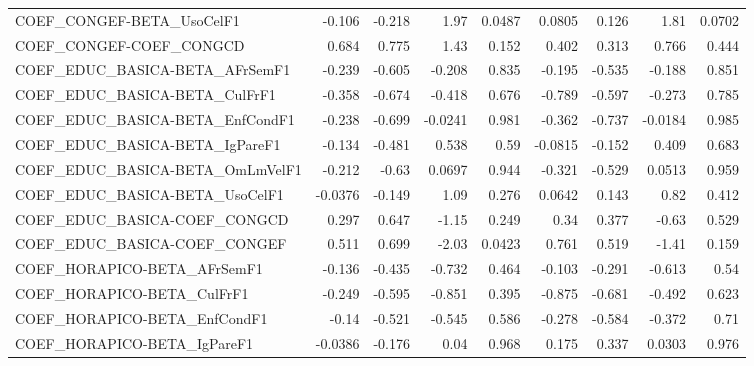 \begin{tabular}{lrrrrrrrr}
COEF\_CONGEF-BETA\_UsoCelF1             &      -0.106 &       -0.218 &    1.97 &   0.0487 &     0.0805 &       0.126 &         1.81 &        0.0702 \\
COEF\_CONGEF-COEF\_CONGCD               &       0.684 &        0.775 &    1.43 &    0.152 &      0.402 &       0.313 &        0.766 &         0.444 \\
COEF\_EDUC\_BASICA-BETA\_AFrSemF1        &      -0.239 &       -0.605 &  -0.208 &    0.835 &     -0.195 &      -0.535 &       -0.188 &         0.851 \\
COEF\_EDUC\_BASICA-BETA\_CulFrF1         &      -0.358 &       -0.674 &  -0.418 &    0.676 &     -0.789 &      -0.597 &       -0.273 &         0.785 \\
COEF\_EDUC\_BASICA-BETA\_EnfCondF1       &      -0.238 &       -0.699 & -0.0241 &    0.981 &     -0.362 &      -0.737 &      -0.0184 &         0.985 \\
COEF\_EDUC\_BASICA-BETA\_IgPareF1        &      -0.134 &       -0.481 &   0.538 &     0.59 &    -0.0815 &      -0.152 &        0.409 &         0.683 \\
COEF\_EDUC\_BASICA-BETA\_OmLmVelF1       &      -0.212 &        -0.63 &  0.0697 &    0.944 &     -0.321 &      -0.529 &       0.0513 &         0.959 \\
COEF\_EDUC\_BASICA-BETA\_UsoCelF1        &     -0.0376 &       -0.149 &    1.09 &    0.276 &     0.0642 &       0.143 &         0.82 &         0.412 \\
COEF\_EDUC\_BASICA-COEF\_CONGCD          &       0.297 &        0.647 &   -1.15 &    0.249 &       0.34 &       0.377 &        -0.63 &         0.529 \\
COEF\_EDUC\_BASICA-COEF\_CONGEF          &       0.511 &        0.699 &   -2.03 &   0.0423 &      0.761 &       0.519 &        -1.41 &         0.159 \\
COEF\_HORAPICO-BETA\_AFrSemF1           &      -0.136 &       -0.435 &  -0.732 &    0.464 &     -0.103 &      -0.291 &       -0.613 &          0.54 \\
COEF\_HORAPICO-BETA\_CulFrF1            &      -0.249 &       -0.595 &  -0.851 &    0.395 &     -0.875 &      -0.681 &       -0.492 &         0.623 \\
COEF\_HORAPICO-BETA\_EnfCondF1          &       -0.14 &       -0.521 &  -0.545 &    0.586 &     -0.278 &      -0.584 &       -0.372 &          0.71 \\
COEF\_HORAPICO-BETA\_IgPareF1           &     -0.0386 &       -0.176 &    0.04 &    0.968 &      0.175 &       0.337 &       0.0303 &         0.976 \\

\end{tabular}
